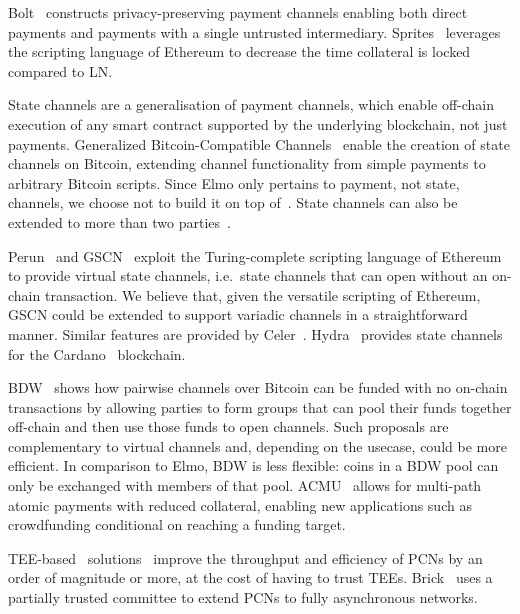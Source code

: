   Bolt~\cite{10.1145/3133956.3134093} constructs privacy-preserving payment
  channels enabling both direct payments and payments with a single untrusted
  intermediary. Sprites~\cite{sprites} leverages the scripting language of
  E\-the\-re\-um to decrease the time collateral is locked compared to LN.

  State channels are a generalisation of payment channels, which enable
  off-chain execution of any smart contract supported by the underlying
  blockchain, not just payments. Generalized Bitcoin-Compatible
  Channels~\cite{DBLP:journals/iacr/AumayrEEFHMMR20} enable the creation of
  state channels on Bitcoin, extending channel functionality from simple
  payments to arbitrary Bitcoin scripts. Since Elmo only pertains to payment,
  not state, channels, we choose not to build it on top
  of~\cite{DBLP:journals/iacr/AumayrEEFHMMR20}. State channels can also be
  extended to more than two
  parties~\cite{DBLP:conf/asiaccs/LiaoZSS22,DBLP:conf/eurocrypt/DziembowskiEFHH19}.

  Perun~\cite{perun} and GSCN~\cite{DBLP:conf/ccs/DziembowskiFH18} exploit the
  Turing-complete scripting language of Ethereum to provide virtual state
  channels, i.e.\ state channels that can open without an on-chain transaction.
  We believe that, given the versatile scripting of Ethereum, GSCN could be
  extended to support variadic channels in a straightforward manner. Similar
  features are provided by Celer~\cite{dong2018celer}.
  Hydra~\cite{cryptoeprint:2020:299} provides state channels for the
  Cardano~\cite{cardano} blockchain.

  BDW~\cite{scalable-funding} shows how pairwise channels over Bitcoin can be
  funded with no on-chain transactions by allowing parties to form groups that
  can pool their funds together off-chain and then use those funds to open
  channels. Such proposals are complementary to virtual channels and, depending
  on the usecase, could be more efficient. In comparison to Elmo, BDW is less
  flexible: coins in a BDW pool can only be exchanged with members of that
  pool. ACMU~\cite{10.1145/3319535.3345666} allows for multi-path atomic
  payments with reduced collateral, enabling new applications such as
  crowdfunding conditional on reaching a funding target.

  TEE-based~\cite{zhao2019sok}
solutions~\cite{teechan,10.1145/3341301.3359627,DBLP:conf/asiaccs/LiaoZSS22,lee2020routee}
  improve the throughput and efficiency of PCNs by an order of magnitude or
  more, at the cost of having to trust TEEs. Brick~\cite{avarikioti2020brick}
  uses a partially trusted committee to extend PCNs to fully asynchronous
  networks.

